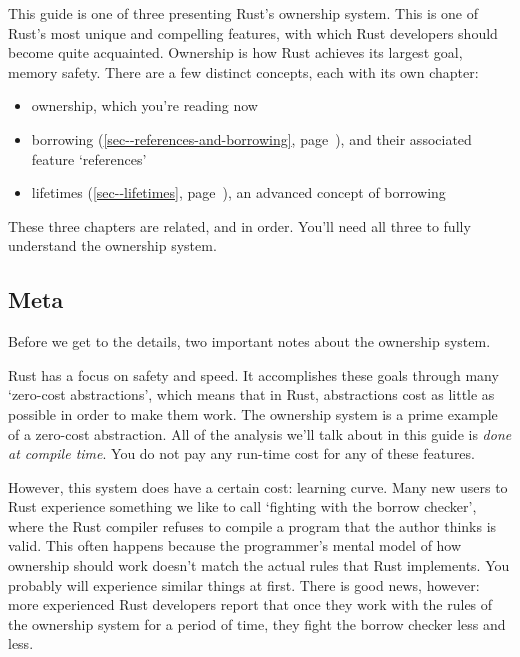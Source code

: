 \documentclass[a4paper,]{book}
\renewcommand*{\hyperref}[2][\ar]{%
  \def\ar{#2}%
  #2 (\autoref{#1}, page~\pageref{#1})}
\begin{document}

This guide is one of three presenting Rust's ownership system. This is
one of Rust's most unique and compelling features, with which Rust
developers should become quite acquainted. Ownership is how Rust
achieves its largest goal, memory safety. There are a few distinct
concepts, each with its own chapter:

\begin{itemize}
\itemsep1pt\parskip0pt
\item
  ownership, which you're reading now
\item
  \hyperref[sec--references-and-borrowing]{borrowing}, and their
  associated feature `references'
\item
  \hyperref[sec--lifetimes]{lifetimes}, an advanced concept of borrowing
\end{itemize}

These three chapters are related, and in order. You'll need all three to
fully understand the ownership system.

\subsection{Meta}\label{meta}

Before we get to the details, two important notes about the ownership
system.

Rust has a focus on safety and speed. It accomplishes these goals
through many `zero-cost abstractions', which means that in Rust,
abstractions cost as little as possible in order to make them work. The
ownership system is a prime example of a zero-cost abstraction. All of
the analysis we'll talk about in this guide is \emph{done at compile
time}. You do not pay any run-time cost for any of these features.

However, this system does have a certain cost: learning curve. Many new
users to Rust experience something we like to call `fighting with the
borrow checker', where the Rust compiler refuses to compile a program
that the author thinks is valid. This often happens because the
programmer's mental model of how ownership should work doesn't match the
actual rules that Rust implements. You probably will experience similar
things at first. There is good news, however: more experienced Rust
developers report that once they work with the rules of the ownership
system for a period of time, they fight the borrow checker less and
less.
\end{document}
